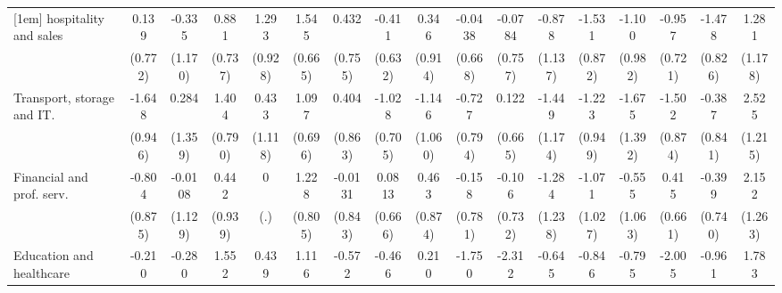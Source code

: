 {\begin{tabular}{l*{16}{c}}
[1em]
hospitality and sales&       0.139         &      -0.335         &       0.881         &       1.293         &       1.545\sym{*}  &       0.432         &      -0.411         &       0.346         &     -0.0438         &     -0.0784         &      -0.878         &      -1.531         &      -1.100         &      -0.957         &      -1.478         &       1.281         \\
                    &     (0.772)         &     (1.170)         &     (0.737)         &     (0.928)         &     (0.665)         &     (0.755)         &     (0.632)         &     (0.914)         &     (0.668)         &     (0.757)         &     (1.137)         &     (0.872)         &     (0.982)         &     (0.721)         &     (0.826)         &     (1.178)         \\
[1em]
Transport, storage and IT.&      -1.648         &       0.284         &       1.404         &       0.433         &       1.097         &       0.404         &      -1.028         &      -1.146         &      -0.727         &       0.122         &      -1.449         &      -1.223         &      -1.675         &      -1.502         &      -0.387         &       2.525\sym{*}  \\
                    &     (0.946)         &     (1.359)         &     (0.790)         &     (1.118)         &     (0.696)         &     (0.863)         &     (0.705)         &     (1.060)         &     (0.794)         &     (0.665)         &     (1.174)         &     (0.949)         &     (1.392)         &     (0.874)         &     (0.841)         &     (1.215)         \\
[1em]
Financial and prof. serv.&      -0.804         &     -0.0108         &       0.442         &           0         &       1.228         &     -0.0131         &      0.0813         &       0.463         &      -0.158         &      -0.106         &      -1.284         &      -1.071         &      -0.555         &       0.415         &      -0.399         &       2.152         \\
                    &     (0.875)         &     (1.129)         &     (0.939)         &         (.)         &     (0.805)         &     (0.843)         &     (0.666)         &     (0.874)         &     (0.781)         &     (0.732)         &     (1.238)         &     (1.027)         &     (1.063)         &     (0.661)         &     (0.740)         &     (1.263)         \\
[1em]
Education and healthcare&      -0.210         &      -0.280         &       1.552         &       0.439         &       1.116         &      -0.572         &      -0.466         &       0.210         &      -1.750         &      -2.312\sym{*}  &      -0.645         &      -0.846         &      -0.795         &      -2.005         &      -0.961         &       1.783         \\

\end{tabular}}
